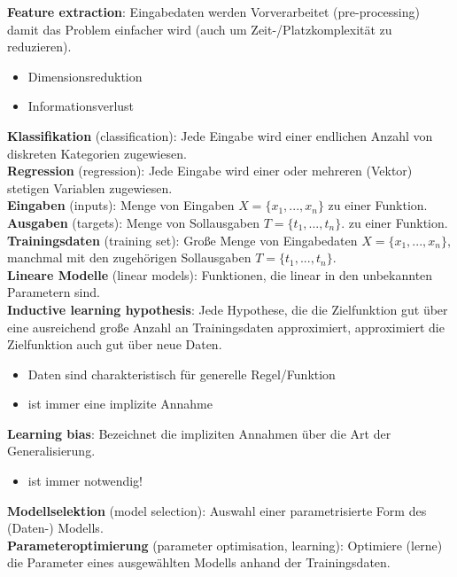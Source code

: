 \textbf{Feature extraction}: Eingabedaten werden Vorverarbeitet (pre-processing) damit das Problem einfacher wird (auch um Zeit-/Platzkomplexität zu reduzieren).\vspace*{-5pt}
\begin{itemize}[$\hookrightarrow$]
	\item Dimensionsreduktion
	\item Informationsverlust
\end{itemize}	
\textbf{Klassifikation} (classification): Jede Eingabe wird einer endlichen Anzahl von diskreten Kategorien zugewiesen.\\[5pt]
\textbf{Regression} (regression): Jede Eingabe wird einer oder mehreren (Vektor) stetigen Variablen zugewiesen.\\[5pt]
\textbf{Eingaben} (inputs): Menge von Eingaben $X = \{x_1, ... , x_n\}$ zu einer Funktion.\\[5pt]
\textbf{Ausgaben} (targets): Menge von Sollausgaben $T=\{t_1, ..., t_n\}$. zu einer Funktion.\\[5pt]
\textbf{Trainingsdaten} (training set): Große Menge von Eingabedaten $X = \{x_1, ... , x_n\}$, manchmal mit den zugehörigen Sollausgaben $T=\{t_1, ..., t_n\}$.\\[5pt]
\textbf{Lineare Modelle} (linear models): Funktionen, die linear in den unbekannten Parametern sind.\\[5pt]
\textbf{Inductive learning hypothesis}: Jede Hypothese, die die Zielfunktion gut über eine ausreichend große Anzahl an Trainingsdaten approximiert, approximiert die Zielfunktion auch gut über neue Daten.\vspace*{-5pt}
\begin{itemize}[$\hookrightarrow$]
	\item Daten sind charakteristisch für generelle Regel/Funktion
	\item ist immer eine implizite Annahme
\end{itemize}
\textbf{Learning bias}: Bezeichnet die impliziten Annahmen über die Art der Generalisierung.\vspace*{-5pt}
\begin{itemize}[$\hookrightarrow$]
	\item ist immer notwendig!
\end{itemize}
\textbf{Modellselektion} (model selection): Auswahl einer parametrisierte Form des (Daten-) Modells.\\[5pt]
\textbf{Parameteroptimierung} (parameter optimisation, learning): Optimiere (lerne) die Parameter eines ausgewählten Modells anhand der Trainingsdaten.
